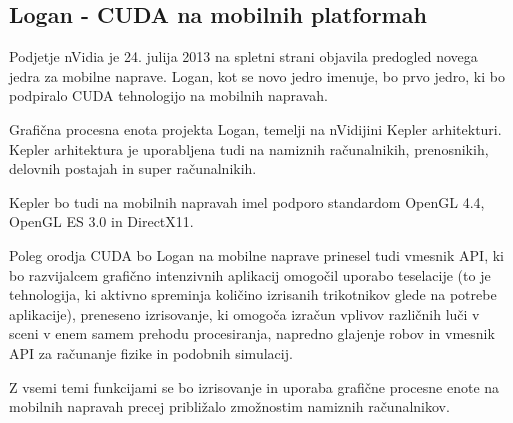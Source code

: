 \subsection{Logan - CUDA na mobilnih platformah}




Podjetje nVidia je 24. julija 2013 \cite{cuda-mobile} na spletni strani objavila predogled novega jedra za mobilne naprave. Logan, kot se novo jedro imenuje, bo prvo jedro, ki bo podpiralo CUDA tehnologijo na mobilnih napravah.

Grafična procesna enota projekta Logan, temelji na nVidijini Kepler arhitekturi. Kepler arhitektura je uporabljena tudi na namiznih računalnikih, prenosnikih, delovnih postajah in super računalnikih.

Kepler bo tudi na mobilnih napravah imel podporo standardom OpenGL 4.4, OpenGL ES 3.0 in DirectX11.

Poleg orodja CUDA bo Logan na mobilne naprave prinesel tudi vmesnik API, ki bo razvijalcem grafično intenzivnih aplikacij omogočil uporabo teselacije (to je tehnologija, ki aktivno spreminja količino izrisanih trikotnikov glede na potrebe aplikacije), preneseno izrisovanje, ki omogoča izračun vplivov različnih luči v sceni v enem samem prehodu procesiranja, napredno glajenje robov in vmesnik API za računanje fizike in podobnih simulacij.

Z vsemi temi funkcijami se bo izrisovanje in uporaba grafične procesne enote na mobilnih napravah precej približalo zmožnostim namiznih računalnikov. 
 

